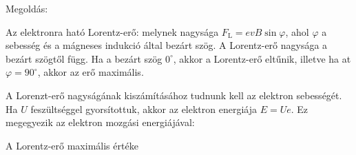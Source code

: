 
\ifdefined\megoldas

 Megoldás: 

 Az elektronra ható Lorentz-erő:
 melynek nagysága $F_\text{L}=e vB\sin\varphi$, ahol $\varphi$ a sebesség és a mágneses indukció által bezárt szög. A Lorentz-erő nagysága a bezárt szögtől függ. Ha a bezárt szög $0^\circ$, akkor a Lorentz-erő eltűnik, illetve ha at $\varphi=90^\circ$, akkor az erő maximális. 

 A Lorenzt-erő nagyságának kiszámításához tudnunk kell az elektron sebességét. Ha $U$ feszültséggel gyorsítottuk, akkor az elektron energiája $E=Ue$. Ez megegyezik az elektron mozgási energiájával: 

 A Lorentz-erő maximális értéke

\fi